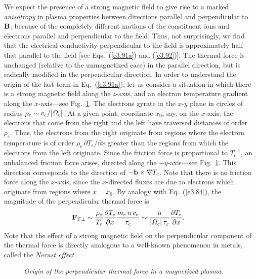 We expect the presence of a strong magnetic field to give rise to a 
marked {\em anisotropy}\/ in  plasma properties between directions parallel
and perpendicular to ${\bf B}$, because of the completely different motions
of the constituent ions and electrons parallel and perpendicular to the field. 
Thus, not surprisingly, we find that the electrical conductivity perpendicular
to the field is approximately half that parallel to the field [see Eqs.~(\ref{e3.91a})
and (\ref{e3.92})]. The thermal force is unchanged (relative to the unmagnetized case)
in the parallel direction, but is radically modified in the
perpendicular direction. In order to understand the origin
of the last term in Eq.~(\ref{e3.91a}), let us consider a situation in
which there is a strong magnetic field along the $z$-axis, and an electron
temperature gradient along the $x$-axis---see Fig.~\ref{f7}. The electrons gyrate
in the $x$-$y$ plane in circles of radius $\rho_e\sim v_e/|{\mit\Omega}_e|$.
At a given point, coordinate $x_0$, say, on the $x$-axis, the electrons that
come from the right and the left have traversed distances of order $\rho_e$. 
Thus, the electrons from the right originate from regions where the
electron temperature is of order $\rho_e\,\partial T_e/\partial x$ greater than
the regions from which the electrons from the left originate. Since the
friction force is proportional to $T_e^{-1}$, an unbalanced friction force
arises, directed along the $-y$-axis---see Fig.~\ref{f7}. This direction
corresponds to the direction of $-{\bf b}\times\nabla T_e$. 
Note that there is
no friction force along the $x$-axis, since the $x$-directed fluxes are due
to electrons which originate from regions where $x=x_0$. 
By analogy with Eq.~(\ref{e3.84}), the magnitude of the perpendicular
thermal force is
\begin{equation}
{\bf F}_{T\perp} \sim \frac{{\rho}_e}{T_e}\frac{\partial T_e}{\partial x}
\frac{m_e\,n\,v_e}{\tau_e} \sim \frac{n}{|{\mit\Omega}_e|\,\tau_e}
\frac{\partial T_e}{\partial x}.
\end{equation}
Note that the effect of a strong magnetic field on the perpendicular
component of the thermal force is directly analogous to a well-known
phenomenon in metals, called the {\em Nernst effect}. 

\begin{figure}
\epsfysize=3in
\centerline{}
\caption{\em Origin of the perpendicular thermal force in a magnetized plasma.}\label{f7}
\end{figure}

